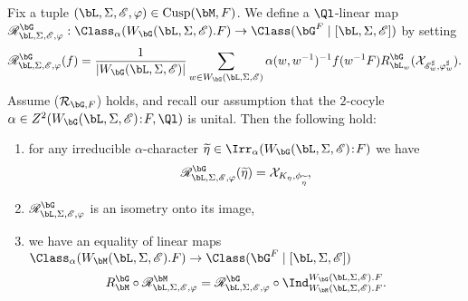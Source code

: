 \documentclass[eqthmnum,nocolour,skinny]{jt-calcs}
\DeclareMathOperator{\Cusp}{Cusp}
\newcommand\sd{
	\mathchoice{\mkern1.5mu}{\mkern1.5mu}{}{}%
	{:}%
	\mathchoice{\mkern1.5mu}{\mkern1.5mu}{}{}
}
\begin{document}
\begin{prop}\label{prop:bumper-DL-ind-char-sheaves}
Fix a tuple $(\bL,\Sigma,\mathscr{E},\varphi) \in \Cusp(\bM,F)$. We define a $\Ql$-linear map $\mathscr{R}^{\bG}_{\bL,\Sigma,\mathscr{E},\varphi} : \Class_{\alpha}(W_{\bG}(\bL,\Sigma,\mathscr{E}).F) \to \Class(\bG^F \mid [\bL,\Sigma,\mathscr{E}])$ by setting
\begin{equation*}
\mathscr{R}^{\bG}_{\bL,\Sigma,\mathscr{E},\varphi}(f) = \frac{1}{|W_{\bG}(\bL,\Sigma,\mathscr{E})|}\sum_{w \in W_{\bG}(\bL,\Sigma,\mathscr{E})} \alpha(w,w^{-1})^{-1}f(w^{-1}F)R_{\bL_w}^{\bG}(\mathcal{X}_{\mathscr{E}_w^{\sharp},\varphi_w^{\sharp}}).
\end{equation*}
Assume ($\mathcal{R}_{\bG,F}$) holds, and recall our assumption that the $2$-cocyle $\alpha \in Z^2(W_{\bG}(\bL,\Sigma,\mathscr{E})\sd F,\Ql)$ is unital. Then the following hold:
\begin{enumerate}
	\item for any irreducible $\alpha$-character $\widetilde{\eta} \in \Irr_{\alpha}(W_{\bG}(\bL,\Sigma,\mathscr{E})\sd F)$ we have
\begin{equation*}
\mathscr{R}^{\bG}_{\bL,\Sigma,\mathscr{E},\varphi}(\widetilde{\eta}) = \mathcal{X}_{K_{\eta},\phi_{\widetilde{\eta}}},
\end{equation*}
	\item $\mathscr{R}^{\bG}_{\bL,\Sigma,\mathscr{E},\varphi}$ is an isometry onto its image,
	\item we have an equality of linear maps $\Class_{\alpha}(W_{\bM}(\bL,\Sigma,\mathscr{E}).F) \to \Class(\bG^F \mid [\bL,\Sigma,\mathscr{E}])$
\begin{equation*}
R_{\bM}^{\bG} \circ \mathscr{R}^{\bM}_{\bL,\Sigma,\mathscr{E},\varphi} = \mathscr{R}^{\bG}_{\bL,\Sigma,\mathscr{E},\varphi} \circ \Ind_{W_{\bM}(\bL,\Sigma,\mathscr{E}).F}^{W_{\bG}(\bL,\Sigma,\mathscr{E}).F}.
\end{equation*}
\end{enumerate}
\end{prop}
\end{document}
